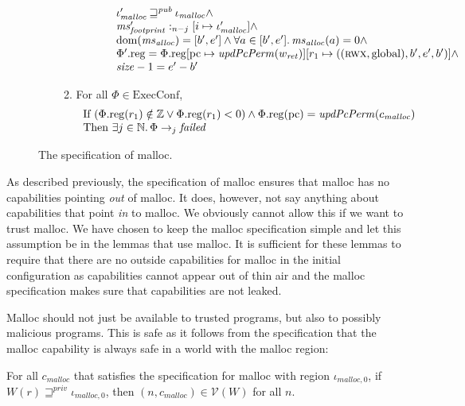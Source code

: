 \documentclass[format=acmsmall, review=true, screen=true]{acmart}
\newcommand{\update}[2]{[#1 \mapsto #2]}
\DeclareMathOperator{\dom}{dom}
\newcommand{\var}[1]{\mathit{#1}}
\newcommand{\hs}{\var{ms}}
\newcommand{\ms}{\hs}
\newcommand{\pcreg}{\mathrm{pc}}
\newcommand{\heap}{\var{mem}}
\newcommand{\size}{\var{size}}
\newcommand{\plainproj}[1]{\mathrm{#1}}
\newcommand{\memreg}[1][\Phi]{#1.\plainproj{reg}}
\newcommand{\failed}{\mathit{failed}}
\newcommand{\plainfun}[2]{
  \ifthenelse{\equal{#2}{}}
  {\mathit{#1}}
  {\mathit{#1}(#2)}
}
\newcommand{\updatePcPerm}[1]{\plainfun{updPcPerm}{#1}}
\newcommand{\futurewk}{\mathbin{\sqsupseteq}^{\var{pub}}}
\newcommand{\futurestr}{\mathbin{\sqsupseteq}^{\var{priv}}}
\newcommand{\heapSat}[3][\heap]{#1 :_{#2} #3}
\newcommand{\codelabel}[1]{\mathit{#1}}
\newcommand{\malloc}{\codelabel{malloc}}
\newcommand{\asmType}{\plaindom{AsmType}}
\newcommand{\plaindom}[1]{\mathrm{#1}}
\newcommand{\ExecConfs}{\plaindom{ExecConf}}
\newcommand{\nats}{\mathbb{N}}
\newcommand{\ints}{\mathbb{Z}}
\newcommand{\intr}[2]{\mathcal{#1}}
\newcommand{\valueintr}[1]{\intr{V}{#1}}
\newcommand{\stdvr}{\valueintr{\asmType}}
\newcommand{\npair}[2][n]{\left(#1,#2 \right)}
\newcommand{\plainperm}[1]{\textsc{#1}}
\newcommand{\rwx}{\plainperm{rwx}}
\newcommand{\plainlocality}[1]{\mathrm{#1}}
\newcommand{\glob}{\plainlocality{global}}
\newcommand{\step}[1][]{\rightarrow_{#1}}
\newenvironment{toplas}{}{}
\begin{document}
\begin{toplas}
\begin{figure}[htb]
\begin{definition}
\begin{enumerate}
\begin{enumerate}
\[\begin{array}{l}
            \qquad \quad \iota_{\malloc}' \futurewk \iota_\malloc \land \\
            \qquad \quad \heapSat[\ms_{\var{footprint}}']{n-j}{[i \mapsto \iota_\malloc']} \land \\
            \qquad \quad \dom(\hs_{\var{alloc}}) = [b',e'] \land \forall a \in [b',e']\ldotp \hs_{\var{alloc}}(a) = 0  \land \\
            \qquad \quad \memreg[\Phi'] = \memreg[\Phi]\update{\pcreg}{\updatePcPerm{w_{\var{ret}}}}\update{r_1}{((\rwx,\glob),b',e',b')} \land \\
            \qquad \quad \size - 1 = e'-b'
          \end{array}
        \]
      \item \label{item:malloc-spec:fail} For all $\Phi \in \ExecConfs$,
        \[
          \begin{array}{l}
            \text{If } (\memreg(r_1) \notin \ints \vee \memreg(r_1) < 0) \land
            \memreg(\pcreg) = \updatePcPerm{c_\malloc} \\
            \text{Then } \exists j \in \nats \ldotp \Phi \step[j] \failed
          \end{array}
        \]
      \end{enumerate}
    \end{enumerate}
  \end{definition}
  
  \caption{The specification of malloc.}
  \label{fig:malloc-spec}
\end{figure}
As described previously, the specification of malloc ensures that malloc has no
capabilities pointing \emph{out} of malloc. It does, however, not say anything about
capabilities that point \emph{in} to malloc. We obviously cannot
allow this if we want to trust malloc. We have chosen to keep the malloc
specification simple and let this assumption be in the lemmas that use malloc.
It is sufficient for these lemmas to require that there are no outside
capabilities for malloc in the initial configuration as capabilities cannot
appear out of thin air and the malloc specification makes sure that capabilities
are not leaked.

Malloc should not just be available to trusted programs, but also to possibly
malicious programs. This is safe as it follows from the specification that the malloc
capability is always safe in a world with the malloc region:
\begin{lemma}
  \label{lem:malloc-in-vr}
  For all $c_\malloc$ that satisfies the specification for malloc with region $\iota_{\malloc,0}$,  if $W(r) \futurestr \iota_{\malloc,0}$, then
  $\npair{c_\malloc} \in \stdvr(W)$ for all $n$.
\end{lemma}


\end{toplas}
\end{document}
